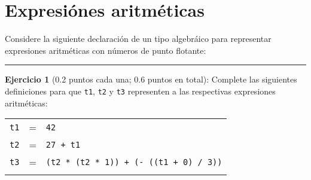 \section{Expresiónes aritméticas}\label{expresiuxf3nes-aritmuxe9ticas}

Considere la siguiente declaración de un tipo algebráico para
representar expresiones aritméticas con números de punto flotante:

\begin{Shaded}
\begin{Highlighting}[]
 
  \FunctionTok{|}         
   \NormalTok{(}\NormalTok{, }\NormalTok{, }\NormalTok{)}
\end{Highlighting}
\end{Shaded}

\begin{center}\rule{3in}{0.4pt}\end{center}

\textbf{Ejercicio 1} (0.2 puntos cada una; 0.6 puntos en total):
Complete las siguientes definiciones para que \texttt{t1}, \texttt{t2} y
\texttt{t3} representen a las respectivas expresiones aritméticas:

\begin{longtable}[c]{@{}lcl@{}}
\toprule\addlinespace
\texttt{t1} & = & \texttt{42}
\\\addlinespace
\texttt{t2} & = & \texttt{27 + t1}
\\\addlinespace
\texttt{t3} & = & \texttt{(t2 * (t2 * 1)) + (- ((t1 + 0) / 3))}
\\\addlinespace
\bottomrule
\end{longtable}

\begin{Shaded}
\begin{Highlighting}[]
\FunctionTok{=}  
\FunctionTok{=}  \NormalTok{(} 
 \NormalTok{))) }
            \NormalTok{))(} \NormalTok{)))}
\end{Highlighting}
\end{Shaded}

